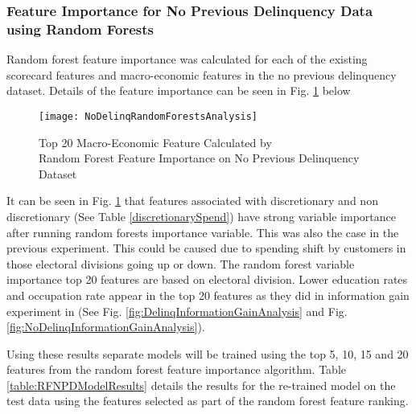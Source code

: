 \subsubsection{Feature Importance for No Previous Delinquency Data using Random Forests}\label{RFNPDExper}

Random forest feature importance was calculated for
each of the existing scorecard features and macro-economic features in the no previous delinquency dataset. Details of the feature importance can be seen in Fig. \ref{fig:NoDelinqRandomForestsAnalysis} below

\begin{figure}[H]
	\texttt{[image: NoDelinqRandomForestsAnalysis]}
	\caption{Top 20 Macro-Economic Feature Calculated by \\
		Random Forest Feature Importance on No Previous Delinquency Dataset}
	\label{fig:NoDelinqRandomForestsAnalysis}
\end{figure}


It can be seen in Fig. \ref{fig:NoDelinqRandomForestsAnalysis} that features associated with discretionary and non discretionary (See Table \ref{discretionarySpend}) have strong variable importance after running random forests importance variable. This was also the case in the previous experiment. This could be caused due to spending shift by customers in those electoral divisions going up or down. The random forest variable importance top 20 features are based on electoral division. Lower education rates and occupation rate appear in the top 20 features as they did in information gain experiment in (See Fig. \ref{fig:DelinqInformationGainAnalysis} and Fig. \ref{fig:NoDelinqInformationGainAnalysis}).


Using these results separate models will be trained using the top 5, 10, 15 and 20 features from
the random forest feature importance algorithm. Table \ref{table:RFNPDModelResults} details the results for the re-trained model
on the test data using the features selected as part of the random forest feature ranking.

